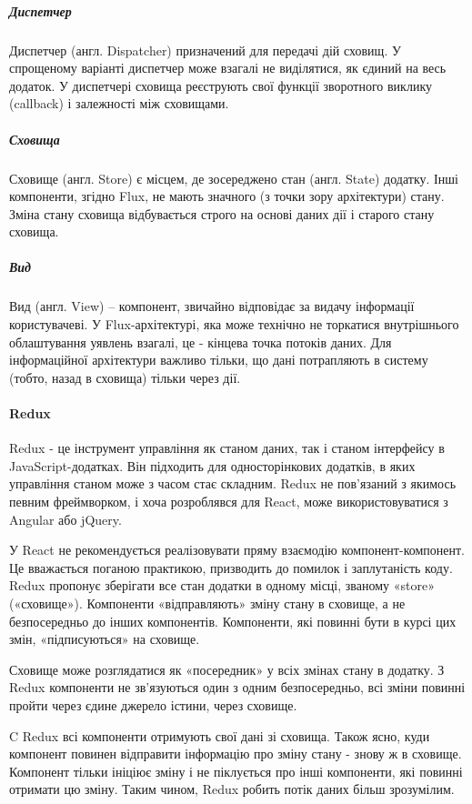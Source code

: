 \subparagraph{Диспетчер}
Диспетчер (англ. Dispatcher) призначений для передачі дій сховищ. У спрощеному варіанті диспетчер може взагалі не виділятися, як єдиний на весь додаток. У диспетчері сховища реєструють свої функції зворотного виклику (callback) і залежності між сховищами.

\subparagraph{Сховища}
Сховище (англ. Store) є місцем, де зосереджено стан (англ. State) додатку. Інші компоненти, згідно Flux, не мають значного (з точки зору архітектури) стану. Зміна стану сховища відбувається строго на основі даних дії і старого стану сховища.

\subparagraph{Вид}
Вид (англ. View) -- компонент, звичайно відповідає за видачу інформації користувачеві. У Flux-архітектурі, яка може технічно не торкатися внутрішнього облаштування уявлень взагалі, це - кінцева точка потоків даних. Для інформаційної архітектури важливо тільки, що дані потрапляють в систему (тобто, назад в сховища) тільки через дії.

\paragraph{Redux}

Redux - це інструмент управління як станом даних, так і станом інтерфейсу в JavaScript-додатках. Він підходить для односторінкових додатків, в яких управління станом може з часом стає складним. Redux не пов'язаний з якимось певним фреймворком, і хоча розроблявся для React, може використовуватися з Angular або jQuery.

У React не рекомендується реалізовувати пряму взаємодію компонент-компонент. Це вважається поганою практикою, призводить до помилок і заплутаність коду. Redux пропонує зберігати все стан додатки в одному місці, званому «store» («сховище»). Компоненти «відправляють» зміну стану в сховище, а не безпосередньо до інших компонентів. Компоненти, які повинні бути в курсі цих змін, «підписуються» на сховище.

Сховище може розглядатися як «посередник» у всіх змінах стану в додатку. З Redux компоненти не зв'язуються один з одним безпосередньо, всі зміни повинні пройти через єдине джерело істини, через сховище.

C Redux всі компоненти отримують свої дані зі сховища. Також ясно, куди компонент повинен відправити інформацію про зміну стану - знову ж в сховище. Компонент тільки ініціює зміну і не піклується про інші компоненти, які повинні отримати цю зміну. Таким чином, Redux робить потік даних більш зрозумілим.

